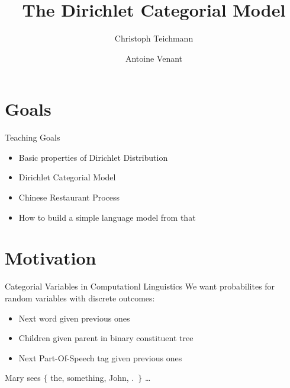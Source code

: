 \documentclass[11pt]{beamer}
\author{Christoph Teichmann \and Antoine Venant}
\title{The Dirichlet Categorial Model}
\subtitle{}
\institute{}
\date{}
\begin{document}
	
	\begin{frame}
		\maketitle
	\end{frame}
	
	\section{Goals}
	
	\begin{frame}{Teaching Goals}
		\begin{itemize}
			\item Basic properties of Dirichlet Distribution
			\item Dirichlet Categorial Model
			\item Chinese Restaurant Process
			\item How to build a simple language model from that
		\end{itemize}
	\end{frame}
	
	\section{Motivation}
	
	\begin{frame}{Categorial Variables in Computationl Linguistics}
		\centering
		We want probabilites for random variables with discrete outcomes:
				
		\begin{itemize}
			\item Next word given previous ones
			\item Children given parent in binary constituent tree
			\item Next Part-Of-Speech tag given previous ones
		\end{itemize}
		
		\vspace{20pt} Mary sees $\lbrace$ the, something, John, .\ $\rbrace$ \dots
	\end{frame}
	
\end{document}
